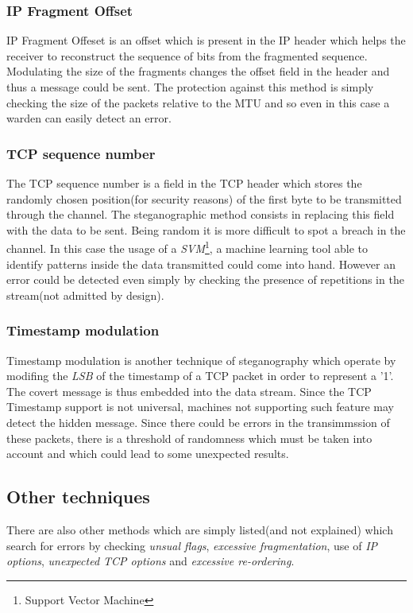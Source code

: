 \documentclass[../../main.tex]{subfiles}
\begin{document}
\subsubsection{IP Fragment Offset} IP Fragment Offeset is an offset which is
present in the IP header which helps the receiver to reconstruct the sequence of
bits from the fragmented sequence.
Modulating the size of the fragments changes the offset field in the header
and thus a message could be sent.
The protection against this method is simply checking the size of the
packets relative to the MTU and so even in this case a warden can easily
detect an error.

\subsubsection{TCP sequence number} The TCP sequence number is a field in the
TCP header which stores the randomly chosen position(for security reasons) of
the first byte to be transmitted through the channel. The steganographic method
consists in replacing this field with the data to be sent.
Being random it is more difficult to spot a breach in the channel.
In this case the usage of a \emph{SVM}\footnote{Support Vector Machine}, a
machine learning tool able to identify patterns inside the data transmitted
could come into hand.
However an error could be detected even simply by checking the presence of
repetitions in the stream(not admitted by design). 

\subsubsection{Timestamp modulation} Timestamp modulation is another technique
of steganography which operate by modifing the \emph{LSB} of the timestamp of a
TCP packet in order to represent a '1'.
The covert message is thus embedded into the data stream.
Since the TCP Timestamp support is not universal, machines not supporting
such feature may detect the hidden message. Since there could be errors in the transimmssion of these packets, there is a 
threshold of randomness which must be taken into account and which could lead to some unexpected results.

\subsection{Other techniques}
There are also other methods which are simply listed(and not explained) which search for errors by checking 
\emph{unsual flags}, \emph{excessive fragmentation}, use of \emph{IP
options}, \emph{unexpected TCP options} and \emph{excessive re-ordering}.
\end{document}
